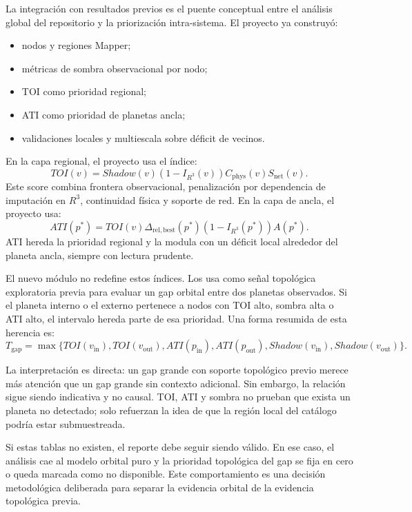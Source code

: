 La integraci\'on con resultados previos es el puente conceptual entre el an\'alisis global del repositorio y la priorizaci\'on intra-sistema. El proyecto ya construy\'o:

\begin{itemize}
\item nodos y regiones Mapper;
\item m\'etricas de sombra observacional por nodo;
\item TOI como prioridad regional;
\item ATI como prioridad de planetas ancla;
\item validaciones locales y multiescala sobre d\'eficit de vecinos.
\end{itemize}

En la capa regional, el proyecto usa el \'indice:
\[
TOI(v) =
Shadow(v)(1-I_{R^3}(v))C_{\mathrm{phys}}(v)S_{\mathrm{net}}(v).
\]
Este score combina frontera observacional, penalizaci\'on por dependencia de imputaci\'on en $R^3$, continuidad f\'isica y soporte de red. En la capa de ancla, el proyecto usa:
\[
ATI(p^\ast) =
TOI(v)\Delta_{\mathrm{rel,best}}(p^\ast)
(1-I_{R^3}(p^\ast))A(p^\ast).
\]
ATI hereda la prioridad regional y la modula con un d\'eficit local alrededor del planeta ancla, siempre con lectura prudente.

El nuevo m\'odulo no redefine estos \'indices. Los usa como se\~nal topol\'ogica exploratoria previa para evaluar un gap orbital entre dos planetas observados. Si el planeta interno o el externo pertenece a nodos con TOI alto, sombra alta o ATI alto, el intervalo hereda parte de esa prioridad. Una forma resumida de esta herencia es:
\[
T_{\mathrm{gap}} =
\max\{
TOI(v_{\mathrm{in}}),
TOI(v_{\mathrm{out}}),
ATI(p_{\mathrm{in}}),
ATI(p_{\mathrm{out}}),
Shadow(v_{\mathrm{in}}),
Shadow(v_{\mathrm{out}})
\}.
\]

La interpretaci\'on es directa: un gap grande con soporte topol\'ogico previo merece m\'as atenci\'on que un gap grande sin contexto adicional. Sin embargo, la relaci\'on sigue siendo indicativa y no causal. TOI, ATI y sombra no prueban que exista un planeta no detectado; solo refuerzan la idea de que la regi\'on local del cat\'alogo podr\'ia estar submuestreada.

Si estas tablas no existen, el reporte debe seguir siendo v\'alido. En ese caso, el an\'alisis cae al modelo orbital puro y la prioridad topol\'ogica del gap se fija en cero o queda marcada como no disponible. Este comportamiento es una decisi\'on metodol\'ogica deliberada para separar la evidencia orbital de la evidencia topol\'ogica previa.
